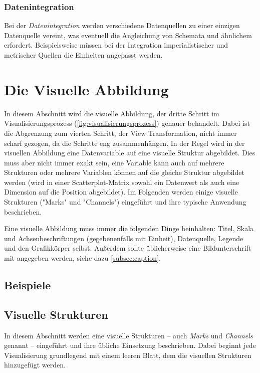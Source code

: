 			\subsubsection{Datenintegration}
				Bei der \emph{Datenintegration} werden verschiedene Datenquellen zu einer einzigen Datenquelle vereint, was eventuell die Angleichung von Schemata und ähnlichem erfordert. Beispielsweise müssen bei der Integration imperialistischer und metrischer Quellen die Einheiten angepasst werden.

	\section{Die Visuelle Abbildung}
		\label{sec:visualMapping}

		In diesem Abschnitt wird die visuelle Abbildung, der dritte Schritt im Visualisierungsprozess (\autoref{fig:visualisierungsprozess}) genauer behandelt. Dabei ist die Abgrenzung zum vierten Schritt, der View Transformation, nicht immer scharf gezogen, da die Schritte eng zusammenhängen. In der Regel wird in der visuellen Abbildung eine Datenvariable auf eine visuelle Struktur abgebildet. Dies muss aber nicht immer exakt sein, \dh eine Variable kann auch auf mehrere Strukturen oder mehrere Variablen können auf die gleiche Struktur abgebildet werden (\bspw wird in einer Scatterplot-Matrix sowohl ein Datenwert als auch eine Dimension auf die Position abgebildet). Im Folgenden werden einige visuelle Strukturen ("Marks" und "Channels") eingeführt und ihre typische Anwendung beschrieben.

		Eine visuelle Abbildung muss immer die folgenden Dinge beinhalten: Titel, Skala und Achsenbeschriftungen (gegebenenfalls mit Einheit), Datenquelle, Legende und den Grafikkörper selbst. Außerdem sollte üblicherweise eine Bildunterschrift mit angegeben werden, siehe dazu \autoref{subsec:caption}.

		\subsection{Beispiele}

		\subsection{Visuelle Strukturen}
			In diesem Abschnitt werden eine visuelle Strukturen -- auch \emph{Marks} und \emph{Channels} genannt -- eingeführt und ihre übliche Einsetzung beschrieben. Dabei beginnt jede Visualisierung grundlegend mit einem leeren Blatt, dem die visuellen Strukturen hinzugefügt werden.

